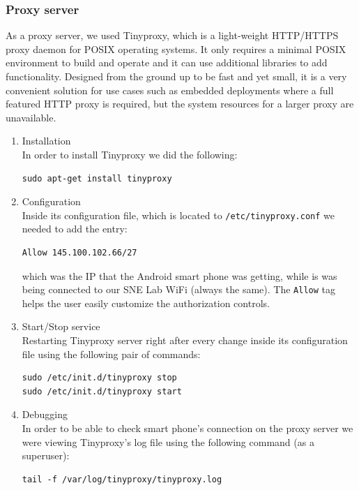 \documentclass[12pt, a4paper]{report}
\begin{document}
\subsubsection{Proxy server}

As a proxy server, we used Tinyproxy, which is a light-weight HTTP/HTTPS proxy daemon for POSIX operating systems. It only requires a minimal POSIX environment to build and operate and it can use additional libraries to add functionality. Designed from the ground up to be fast and yet small, it is a very convenient solution for use cases such as embedded deployments where a full featured HTTP proxy is required, but the system resources for a larger proxy are unavailable.

\begin{enumerate}
\item Installation \\
In order to install Tinyproxy we did the following:
\begin{lstlisting}[frame=single, breaklines=true]
sudo apt-get install tinyproxy			
\end{lstlisting}	

\item Configuration \\
Inside its configuration file, which is located to \texttt{/etc/tinyproxy.conf} we needed to add the entry:
\begin{lstlisting}[frame=single, breaklines=true]
Allow 145.100.102.66/27			
\end{lstlisting}		
which was the IP that the Android smart phone was getting, while is 			was being connected to our SNE Lab WiFi (always the same). The \texttt{Allow} tag helps the user easily customize the authorization controls. 

\item Start/Stop service \\
Restarting Tinyproxy server right after every change inside its configuration file using the following pair of commands:
\begin{lstlisting}[frame=single, breaklines=true]
sudo /etc/init.d/tinyproxy stop
sudo /etc/init.d/tinyproxy start			
\end{lstlisting}

\item Debugging \\
In order to be able to check smart phone's connection on the proxy server we were viewing Tinyproxy's log file using the following command (as a superuser):
\begin{lstlisting}[frame=single, breaklines=true]
tail -f /var/log/tinyproxy/tinyproxy.log
\end{lstlisting}
\end{enumerate}
\end{document}
